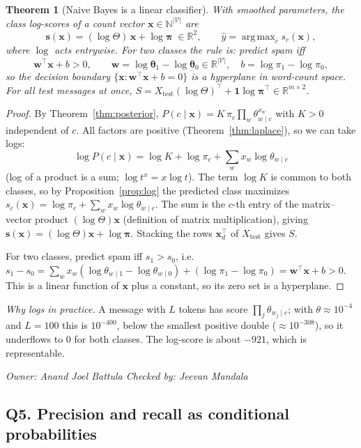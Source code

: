 \documentclass[11pt]{article}
\newcommand{\owner}[2]{\par\noindent\textit{Owner: #1 \hfill Checked by: #2}\par\medskip}
\theoremstyle{plain}
\newtheorem{theorem}{Theorem}
\theoremstyle{definition}
\newcommand{\R}{\mathbb{R}}
\newcommand{\N}{\mathbb{N}}
\newcommand{\Vs}{|\mathcal{V}|}
\newcommand{\bx}{\mathbf{x}}
\newcommand{\bw}{\mathbf{w}}
\DeclareMathOperator*{\argmax}{arg\,max}
\begin{document}
\begin{theorem}[Naive Bayes is a linear classifier]\label{thm:linear}
With smoothed parameters, the class log-scores of a count vector $\bx\in\N^{\Vs}$ are
\[
\mathbf s(\bx)=(\log\Theta)\,\bx+\log\boldsymbol\pi\;\in\R^2,\qquad
\hat y=\argmax_c s_c(\bx),
\]
where $\log$ acts entrywise. For two classes the rule is: predict spam iff
\[
\bw^\top\bx+b>0,\qquad \bw=\log\boldsymbol\theta_{1}-\log\boldsymbol\theta_{0}\in\R^{\Vs},\quad
b=\log\pi_1-\log\pi_0,
\]
so the decision boundary $\{\bx:\bw^\top\bx+b=0\}$ is a hyperplane in word-count space.
For all test messages at once, $S=X_{\text{test}}(\log\Theta)^\top+\mathbf 1\log\boldsymbol\pi^\top\in\R^{m\times2}$.
\end{theorem}
\begin{proof}
By Theorem~\ref{thm:posterior}, $P(c\mid\bx)=K\,\pi_c\prod_w\theta_{w\mid c}^{x_w}$ with
$K>0$ independent of $c$. All factors are positive (Theorem~\ref{thm:laplace}), so we can take logs:
\[
\log P(c\mid\bx)=\log K+\log\pi_c+\sum_{w}x_w\log\theta_{w\mid c}
\]
(log of a product is a sum; $\log t^{x}=x\log t$). The term $\log K$ is common to both classes,
so by Proposition~\ref{prop:log} the predicted class maximizes
$s_c(\bx)=\log\pi_c+\sum_w x_w\log\theta_{w\mid c}$. The sum is the $c$-th entry of the
matrix--vector product $(\log\Theta)\bx$ (definition of matrix multiplication), giving
$\mathbf s(\bx)=(\log\Theta)\bx+\log\boldsymbol\pi$. Stacking the rows $\bx_d^\top$ of
$X_{\text{test}}$ gives $S$.

For two classes, predict spam iff $s_1>s_0$, i.e.
$s_1-s_0=\sum_w x_w(\log\theta_{w\mid1}-\log\theta_{w\mid0})+(\log\pi_1-\log\pi_0)=\bw^\top\bx+b>0$.
This is a linear function of $\bx$ plus a constant, so its zero set is a hyperplane.
\end{proof}
\noindent\emph{Why logs in practice.} A message with $L$ tokens has score
$\prod_j\theta_{w_j\mid c}$; with $\theta\approx10^{-4}$ and $L=100$ this is $10^{-400}$, below the
smallest positive double ($\approx 10^{-308}$), so it underflows to 0 for both classes. The
log-score is about $-921$, which is representable.
\owner{Anand Joel Battula}{Jeevan Mandala}

\subsection{Q5. Precision and recall as conditional probabilities}\label{sec:q5}
\end{document}

